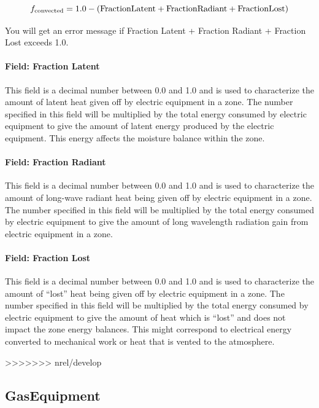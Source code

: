 \begin{equation}
  f_{\rm{convected}} = 1.0 - (\rm{Fraction Latent} + \rm{Fraction Radiant} + \rm{Fraction Lost})
\end{equation}

You will get an error message if Fraction Latent + Fraction Radiant + Fraction Lost exceeds 1.0.

\paragraph{Field: Fraction Latent}\label{field-fraction-latent-ee-definition}

This field is a decimal number between 0.0 and 1.0 and is used to characterize the amount of latent heat given off by electric equipment in a zone. The number specified in this field will be multiplied by the total energy consumed by electric equipment to give the amount of latent energy produced by the electric equipment. This energy affects the moisture balance within the zone.

\paragraph{Field: Fraction Radiant}\label{field-fraction-radiant-2-ee-definition}

This field is a decimal number between 0.0 and 1.0 and is used to characterize the amount of long-wave radiant heat being given off by electric equipment in a zone. The number specified in this field will be multiplied by the total energy consumed by electric equipment to give the amount of long wavelength radiation gain from electric equipment in a zone.

\paragraph{Field: Fraction Lost}\label{field-fraction-lost-ee-definition}

This field is a decimal number between 0.0 and 1.0 and is used to characterize the amount of ``lost'' heat being given off by electric equipment in a zone. The number specified in this field will be multiplied by the total energy consumed by electric equipment to give the amount of heat which is ``lost'' and does not impact the zone energy balances. This might correspond to electrical energy converted to mechanical work or heat that is vented to the atmosphere.

>>>>>>> nrel/develop
\subsection{GasEquipment}\label{gasequipment}

